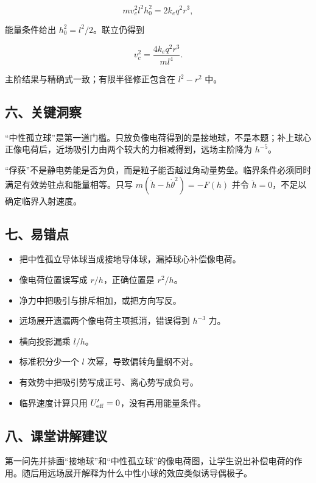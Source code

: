 \documentclass[12pt,a4paper,UTF8]{ctexart}
\newcommand{\tightlist}{\setlength{\itemsep}{0pt}\setlength{\parskip}{0pt}}
\begin{document}
\[mv_c^2l^2h_0^2=2k_eq^2r^3,\]

能量条件给出 \(h_0^2=l^2/2\)。联立仍得到

\[v_c^2=\frac{4k_eq^2r^3}{ml^4}.\]

主阶结果与精确式一致；有限半径修正包含在 \(l^2-r^2\) 中。

\subsection{六、关键洞察}\label{ux516dux5173ux952eux6d1eux5bdf-3}

``中性孤立球''是第一道门槛。只放负像电荷得到的是接地球，不是本题；补上球心正像电荷后，近场吸引力由两个较大的力相减得到，远场主阶降为
\(h^{-5}\)。

``俘获''不是静电势能是否为负，而是粒子能否越过角动量势垒。临界条件必须同时满足有效势驻点和能量相等。只写
\(m(\ddot h-h\dot\theta^2)=-F(h)\) 并令
\(\ddot h=0\)，不足以确定临界入射速度。

\subsection{七、易错点}\label{ux4e03ux6613ux9519ux70b9-3}

\begin{itemize}
\tightlist
\item
  把中性孤立导体球当成接地导体球，漏掉球心补偿像电荷。
\item
  像电荷位置误写成 \(r/h\)，正确位置是 \(r^2/h\)。
\item
  净力中把吸引与排斥相加，或把方向写反。
\item
  远场展开遗漏两个像电荷主项抵消，错误得到 \(h^{-3}\) 力。
\item
  横向投影漏乘 \(l/h\)。
\item
  标准积分少一个 \(l\) 次幂，导致偏转角量纲不对。
\item
  有效势中把吸引势写成正号、离心势写成负号。
\item
  临界速度计算只用 \(U'_{\rm eff}=0\)，没有再用能量条件。
\end{itemize}

\subsection{八、课堂讲解建议}\label{ux516bux8bfeux5802ux8bb2ux89e3ux5efaux8bae-3}

第一问先并排画``接地球''和``中性孤立球''的像电荷图，让学生说出补偿电荷的作用。随后用远场展开解释为什么中性小球的效应类似诱导偶极子。
\end{document}
